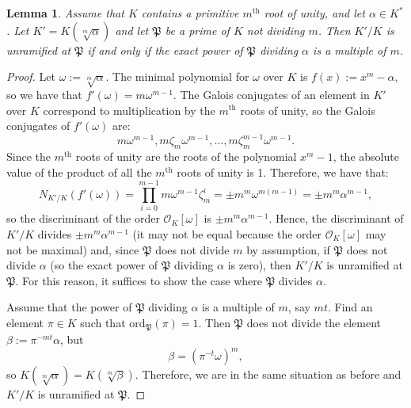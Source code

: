 \documentclass[a4paper, 12pt]{amsart}
\theoremstyle{definition}
\theoremstyle{plain}
\theoremstyle{plain}
\theoremstyle{plain}
\newtheorem{lemma0}[defn0]{Lemma}
\theoremstyle{plain}
\theoremstyle{remark}
\theoremstyle{remark}
\theoremstyle{plain}
\newenvironment{lemma}{ \begin{lemma0}}{\end{lemma0}}
\renewcommand{\P}{\mathfrak{P}}
\begin{document}
	\begin{lemma}\label{orderofP}
		Assume that $K$ contains a primitive $m^\text{th}$ root of unity, and let $\alpha\in K^*$. Let $K'=K(\sqrt[m]{\alpha})$ and let $\P$ be a prime of $K$ not dividing $m$. Then $K'/K$ is unramified at $\P$ if and only if the exact power of $\P$ dividing $\alpha$ is a multiple of $m$.
	\end{lemma}
	\begin{proof}
		Let $\omega:=\sqrt[m]{\alpha}$. The minimal polynomial for $\omega$ over $K$ is $f(x):=x^m-\alpha$, so we have that $f'(\omega)=m\omega^{m-1}$. The Galois conjugates of an element in $K'$ over $K$ correspond to multiplication by the $m^\text{th}$ roots of unity, so the Galois conjugates of $f'(\omega)$ are:
		\begin{equation*}
			m\omega^{m-1}, m\zeta_m\omega^{m-1},\ldots,m\zeta_m^{m-1}\omega^{m-1}.
		\end{equation*}
		Since the $m^\text{th}$ roots of unity are the roots of the polynomial $x^m-1$, the absolute value of the product of all the $m^\text{th}$ roots of unity is 1. Therefore, we have that:
		\begin{equation*}
			N_{K'/K}(f'(\omega))=\prod_{i=0}^{m-1}m\omega^{m-1}\zeta_m^i=\pm m^m\omega^{m(m-1)}=\pm m^m\alpha^{m-1},
		\end{equation*}
		so the discriminant of the order $\mathcal{O}_K[\omega]$ is $\pm m^m\alpha^{m-1}$. Hence, the discriminant of $K'/K$ divides $\pm m^m\alpha^{m-1}$ (it may not be equal because the order $\mathcal{O}_K[\omega]$ may not be maximal) and, since $\P$ does not divide $m$ by assumption, if $\P$ does not divide $\alpha$ (so the exact power of $\P$ dividing $\alpha$ is zero), then $K'/K$ is unramified at $\P$. For this reason, it suffices to show the case where $\P$ divides $\alpha$.
		
		Assume that the power of $\P$ dividing $\alpha$ is a multiple of $m$, say $mt$. Find an element $\pi\in K$ such that $\text{ord}_\P(\pi)=1$. Then $\P$ does not divide the element $\beta:=\pi^{-mt}\alpha$, but
		\begin{equation*}
			\beta=(\pi^{-t}\omega)^m,
		\end{equation*}
		so $K(\sqrt[m]{\alpha})=K(\sqrt[m]{\beta})$. Therefore, we are in the same situation as before and $K'/K$ is unramified at $\P$.
		

\end{proof}
\end{document}
